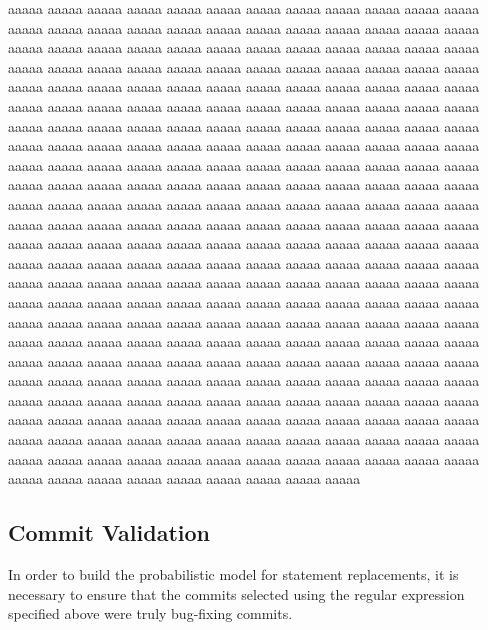 
aaaaa aaaaa aaaaa aaaaa aaaaa aaaaa aaaaa aaaaa aaaaa aaaaa
aaaaa aaaaa aaaaa aaaaa aaaaa aaaaa aaaaa aaaaa aaaaa aaaaa
aaaaa aaaaa aaaaa aaaaa aaaaa aaaaa aaaaa aaaaa aaaaa aaaaa
aaaaa aaaaa aaaaa aaaaa aaaaa aaaaa aaaaa aaaaa aaaaa aaaaa
aaaaa aaaaa aaaaa aaaaa aaaaa aaaaa aaaaa aaaaa aaaaa aaaaa
aaaaa aaaaa aaaaa aaaaa aaaaa aaaaa aaaaa aaaaa aaaaa aaaaa
aaaaa aaaaa aaaaa aaaaa aaaaa aaaaa aaaaa aaaaa aaaaa aaaaa
aaaaa aaaaa aaaaa aaaaa aaaaa aaaaa aaaaa aaaaa aaaaa aaaaa
aaaaa aaaaa aaaaa aaaaa aaaaa aaaaa aaaaa aaaaa aaaaa aaaaa
aaaaa aaaaa aaaaa aaaaa aaaaa aaaaa aaaaa aaaaa aaaaa aaaaa
aaaaa aaaaa aaaaa aaaaa aaaaa aaaaa aaaaa aaaaa aaaaa aaaaa
aaaaa aaaaa aaaaa aaaaa aaaaa aaaaa aaaaa aaaaa aaaaa aaaaa
aaaaa aaaaa aaaaa aaaaa aaaaa aaaaa aaaaa aaaaa aaaaa aaaaa
aaaaa aaaaa aaaaa aaaaa aaaaa aaaaa aaaaa aaaaa aaaaa aaaaa
aaaaa aaaaa aaaaa aaaaa aaaaa aaaaa aaaaa aaaaa aaaaa aaaaa
aaaaa aaaaa aaaaa aaaaa aaaaa aaaaa aaaaa aaaaa aaaaa aaaaa
aaaaa aaaaa aaaaa aaaaa aaaaa aaaaa aaaaa aaaaa aaaaa aaaaa
aaaaa aaaaa aaaaa aaaaa aaaaa aaaaa aaaaa aaaaa aaaaa aaaaa
aaaaa aaaaa aaaaa aaaaa aaaaa aaaaa aaaaa aaaaa aaaaa aaaaa
aaaaa aaaaa aaaaa aaaaa aaaaa aaaaa aaaaa aaaaa aaaaa aaaaa
aaaaa aaaaa aaaaa aaaaa aaaaa aaaaa aaaaa aaaaa aaaaa aaaaa
aaaaa aaaaa aaaaa aaaaa aaaaa aaaaa aaaaa aaaaa aaaaa aaaaa
aaaaa aaaaa aaaaa aaaaa aaaaa aaaaa aaaaa aaaaa aaaaa aaaaa
aaaaa aaaaa aaaaa aaaaa aaaaa aaaaa aaaaa aaaaa aaaaa aaaaa
aaaaa aaaaa aaaaa aaaaa aaaaa aaaaa aaaaa aaaaa aaaaa aaaaa
aaaaa aaaaa aaaaa aaaaa aaaaa aaaaa aaaaa aaaaa aaaaa aaaaa
aaaaa aaaaa aaaaa aaaaa aaaaa aaaaa aaaaa aaaaa aaaaa aaaaa
aaaaa aaaaa aaaaa aaaaa aaaaa aaaaa aaaaa aaaaa aaaaa aaaaa
aaaaa aaaaa aaaaa aaaaa aaaaa aaaaa aaaaa aaaaa aaaaa aaaaa
aaaaa aaaaa aaaaa aaaaa aaaaa aaaaa aaaaa

\subsection{Commit Validation}

In order to build the probabilistic model for statement replacements, it is necessary to ensure that
the commits selected using the regular expression specified above were
truly bug-fixing commits.

